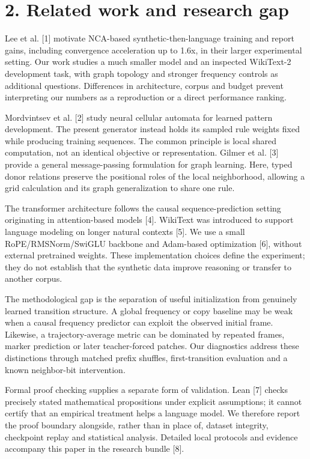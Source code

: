 \documentclass[11pt,a4paper]{article}
\begin{document}
\section*{2. Related work and research gap}
Lee et al. [1] motivate NCA-based synthetic-then-language training and report gains, including convergence acceleration up to 1.6x, in their larger experimental setting. Our work studies a much smaller model and an inspected WikiText-2 development task, with graph topology and stronger frequency controls as additional questions. Differences in architecture, corpus and budget prevent interpreting our numbers as a reproduction or a direct performance ranking.

Mordvintsev et al. [2] study neural cellular automata for learned pattern development. The present generator instead holds its sampled rule weights fixed while producing training sequences. The common principle is local shared computation, not an identical objective or representation. Gilmer et al. [3] provide a general message-passing formulation for graph learning. Here, typed donor relations preserve the positional roles of the local neighborhood, allowing a grid calculation and its graph generalization to share one rule.

The transformer architecture follows the causal sequence-prediction setting originating in attention-based models [4]. WikiText was introduced to support language modeling on longer natural contexts [5]. We use a small RoPE/\allowbreak{}RMSNorm/\allowbreak{}SwiGLU backbone and Adam-based optimization [6], without external pretrained weights. These implementation choices define the experiment; they do not establish that the synthetic data improve reasoning or transfer to another corpus.

The methodological gap is the separation of useful initialization from genuinely learned transition structure. A global frequency or copy baseline may be weak when a causal frequency predictor can exploit the observed initial frame. Likewise, a trajectory-average metric can be dominated by repeated frames, marker prediction or later teacher-forced patches. Our diagnostics address these distinctions through matched prefix shuffles, first-transition evaluation and a known neighbor-bit intervention.

Formal proof checking supplies a separate form of validation. Lean [7] checks precisely stated mathematical propositions under explicit assumptions; it cannot certify that an empirical treatment helps a language model. We therefore report the proof boundary alongside, rather than in place of, dataset integrity, checkpoint replay and statistical analysis. Detailed local protocols and evidence accompany this paper in the research bundle [8].
\end{document}

